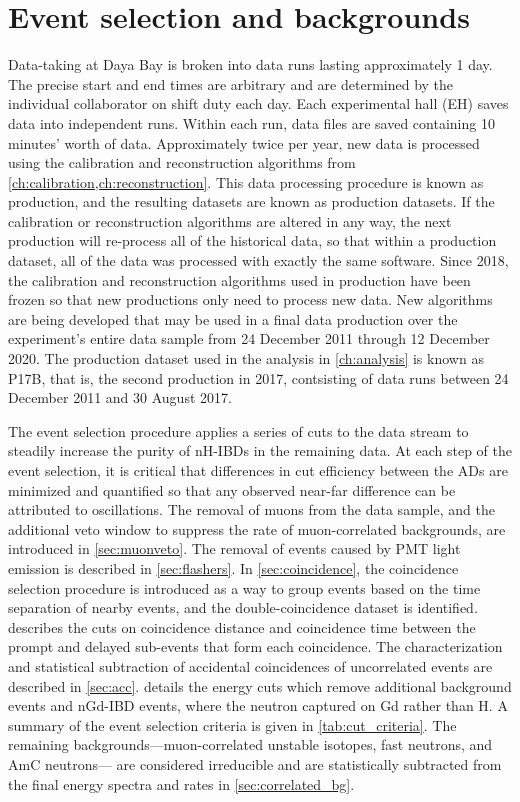 \chapter{Event selection and backgrounds}
\label{ch:event_selection}

Data-taking at Daya Bay is broken into data runs
lasting approximately 1 day.
The precise start and end times are arbitrary
and are determined by the individual collaborator
on shift duty each day.
Each experimental hall (EH) saves data into independent runs.
Within each run, data files are saved containing 10 minutes' worth of data.
Approximately twice per year, new data is processed
using the calibration and reconstruction algorithms from
\cref{ch:calibration,ch:reconstruction}.
This data processing procedure is known as production, and the resulting datasets
are known as production datasets.
If the calibration or reconstruction algorithms are altered in any way,
the next production will re-process all of the historical data,
so that within a production dataset, all of the data was processed
with exactly the same software.
Since 2018, the calibration and reconstruction algorithms used in production have been
frozen so that new productions only need to process new data.
New algorithms are being developed that may be used
in a final data production over the experiment's entire data sample
from 24 December 2011 through 12 December 2020.
The production dataset used in the \thetaot{} analysis in \cref{ch:analysis} is known as P17B,
that is, the second production in 2017,
contsisting of data runs between 24 December 2011
and 30 August 2017.

The event selection procedure applies a series of cuts to the data stream
to steadily increase the purity of nH-IBDs in the remaining data.
At each step of the event selection, it is critical that
differences in cut efficiency between the ADs are
minimized and quantified so that any observed near-far difference
can be attributed to \nuebar{} oscillations.
The removal of muons from the data sample, and the additional veto window
to suppress the rate of muon-correlated backgrounds,
are introduced in \cref{sec:muonveto}.
The removal of events caused by PMT light emission
is described in \cref{sec:flashers}.
In \cref{sec:coincidence}, the coincidence selection procedure
is introduced as a way to group events based on
the time separation of nearby events,
and the double-coincidence dataset is identified.
 describes the cuts on coincidence distance and coincidence time
between the prompt and delayed sub-events that form each coincidence.
The characterization and statistical subtraction of
accidental coincidences of uncorrelated events
are described in \cref{sec:acc}.
 details the energy cuts
which remove additional background events
and nGd-IBD events, where the neutron captured on Gd rather than H.
A summary of the event selection criteria is given in \cref{tab:cut_criteria}.
The remaining backgrounds---muon-correlated unstable isotopes,
fast neutrons, and AmC neutrons---
are considered irreducible and are statistically subtracted
from the final energy spectra and rates
in \cref{sec:correlated_bg}.

